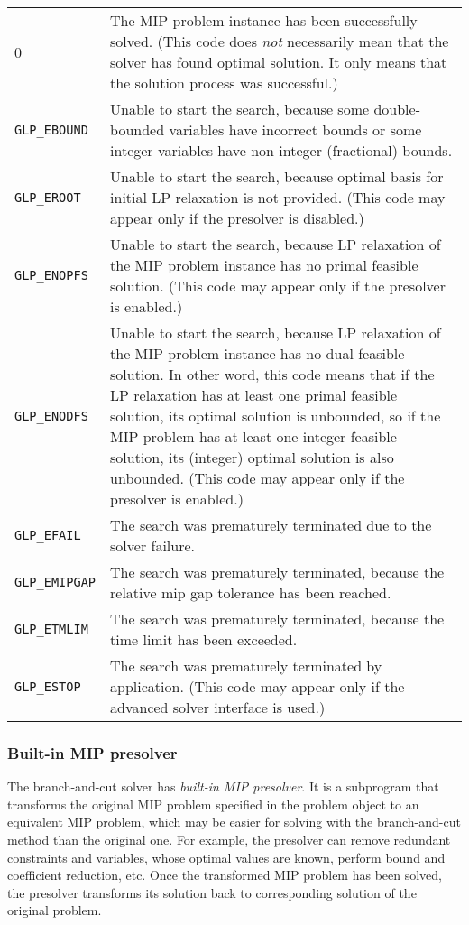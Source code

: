\begin{tabular}{@{}p{25mm}p{97.3mm}@{}}
0 & The MIP problem instance has been successfully solved. (This code
does {\it not} necessarily mean that the solver has found optimal
solution. It only means that the solution process was successful.) \\
\verb|GLP_EBOUND| & Unable to start the search, because some
double-bounded variables have incorrect bounds or some integer variables
have non-integer (fractional) bounds.\\
\verb|GLP_EROOT| & Unable to start the search, because optimal basis for
initial LP relaxation is not provided. (This code may appear only if the
presolver is disabled.)\\
\verb|GLP_ENOPFS| & Unable to start the search, because LP relaxation
of the MIP problem instance has no primal feasible solution. (This code
may appear only if the presolver is enabled.)\\
\verb|GLP_ENODFS| & Unable to start the search, because LP relaxation
of the MIP problem instance has no dual feasible solution. In other
word, this code means that if the LP relaxation has at least one primal
feasible solution, its optimal solution is unbounded, so if the MIP
problem has at least one integer feasible solution, its (integer)
optimal solution is also unbounded. (This code may appear only if the
presolver is enabled.)\\
\verb|GLP_EFAIL| & The search was prematurely terminated due to the
solver failure.\\
\verb|GLP_EMIPGAP| & The search was prematurely terminated, because the
relative mip gap tolerance has been reached.\\
\verb|GLP_ETMLIM| & The search was prematurely terminated, because the
time limit has been exceeded.\\
\verb|GLP_ESTOP| & The search was prematurely terminated by application.
(This code may appear only if the advanced solver interface is used.)\\
\end{tabular}

\subsubsection*{Built-in MIP presolver}

The branch-and-cut solver has {\it built-in MIP presolver}. It is
a subprogram that transforms the original MIP problem specified in the
problem object to an equivalent MIP problem, which may be easier for
solving with the branch-and-cut method than the original one. For
example, the presolver can remove redundant constraints and variables,
whose optimal values are known, perform bound and coefficient reduction,
etc. Once the transformed MIP problem has been solved, the presolver
transforms its solution back to corresponding solution of the original
problem.

